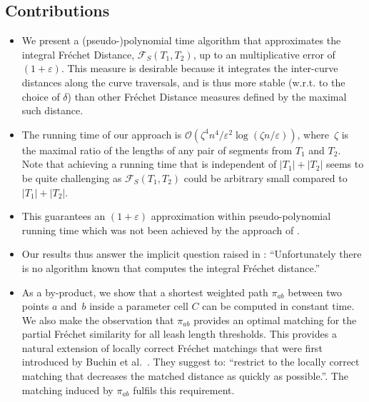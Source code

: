 \documentclass[a4paper,11pt]{article}
\newcommand{\Oh}[1]{\ensuremath{\mathcal{O}\left(#1\right)}\xspace}
\begin{document}
\subsection{Contributions} 
\label{sec:our-result}
\begin{itemize}
\item
We present a (pseudo-)polynomial time algorithm that approximates the integral  Fr\'{e}chet Distance,   $\mathcal{F}_S(T_1,T_2)$, up to an multiplicative error of $(1+\varepsilon)$. This measure is desirable because it integrates the inter-curve distances along the curve traversals, and is thus more stable (w.r.t. to the choice of $\delta$) than other Fr\'{e}chet Distance measures defined by the  maximal such distance.

\item
The running time of our approach is $\Oh{  \zeta^{4}n^4/\varepsilon^{2}  \log (\zeta n /\varepsilon) }$,  where~$\zeta$ is the maximal ratio of the lengths of any pair of segments from $T_1$ and $T_2$. Note that achieving a running time that is independent of $|T_1| + |T_2|$ seems to be quite challenging as $\mathcal{F}_S(T_1,T_2)$ could be arbitrary small compared to $|T_1| + |T_2|$. 

\item This  guarantees   an $(1+\varepsilon)$ approximation within pseudo-polynomial running time which was  not been achieved by the approach of \cite{efrat:mathching}.

\item  Our results thus answer the implicit question raised in \cite{wenk:vehicle}: ``Unfortunately there is no algorithm known that computes the integral Fr\'{e}chet distance.'' 





	
\item		As a by-product, we show that a shortest weighted path $\pi_{ab}$ between two points $a$ and~$b$ inside a parameter cell $C$ can be computed in constant time. We also make the observation that $\pi_{ab}$ provides an optimal matching for the partial Fr\'{e}chet similarity for all leash length thresholds. This provides a natural extension of locally correct Fr\'{e}chet matchings that were first introduced by Buchin et al.~\cite{buchin:locally}. They suggest to: ``restrict to the locally correct matching that decreases the matched distance as quickly as possible.''\cite[p. 237]{buchin:locally}. The matching induced by $\pi_{ab}$ fulfils this requirement. 

\end{itemize}
	
\end{document}
